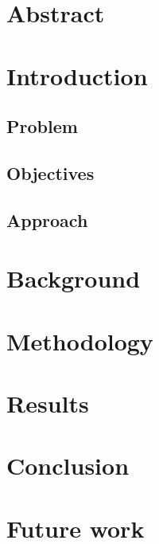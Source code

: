\documentclass[twoside, type=sta, colorback,accentcolor=tud1c, 11pt, numbersubsubsec]{tudthesis}
\begin{document}

\author{Felix Peters}


\makethesistitle


\chapter*{Abstract}

\renewcommand{\contentsname}{Table of contents}
\tableofcontents

\renewcommand{\listfigurename}{List of figures}
\listoffigures

\renewcommand{\listtablename}{List of tables}
\listoftables

\chapter{Introduction}

\section{Problem}

\section{Objectives}

\section{Approach}

\chapter{Background}

\chapter{Methodology}

\chapter{Results}

\chapter{Conclusion}

\chapter{Future work}


\newpage
\renewcommand{\bibname}{References}

\end{document}
